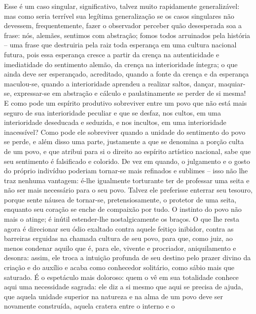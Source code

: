     Esse é um caso singular, significativo, talvez muito rapidamente
    generalizável: mas como seria terrível sua legítima generalização
    se os casos singulares não devessem, frequentemente, fazer o
    observador perceber quão desesperada soa a frase: nós, alemães,
    sentimos com abstração; fomos todos arruinados pela história -- uma
    frase que destruiria pela raiz toda esperança em uma cultura
    nacional futura, pois essa esperança cresce a partir da crença na
    autenticidade e imediatidade do sentimento alemão, da crença na
    interioridade íntegra; o que ainda deve ser esperançado, acreditado,
    quando a fonte da crença e da esperança maculou-se, quando a
    interioridade aprendeu a realizar saltos, dançar, maquiar-se,
    expressar-se em abstração e cálculo e paulatinamente se perder de si
    mesma! E como pode um espírito produtivo sobreviver entre um povo
    que não está mais seguro de sua interioridade peculiar e que se
    desfaz, nos cultos, em uma interioridade deseducada e seduzida, e
    nos incultos, em uma interioridade inacessível? Como pode ele
    sobreviver quando a unidade do sentimento do povo se perde, e além
    disso uma parte, justamente a que se denomina a porção culta de um
    povo, e que atribui para si o direito ao espírito artístico
    nacional, sabe que seu sentimento é falsificado e colorido. De vez
    em quando, o julgamento e o gosto do próprio indivíduo poderiam
    tornar-se mais refinados e sublimes -- isso não lhe traz nenhuma
    vantagem: é-lhe igualmente torturante ter de professar uma seita e
    não ser mais necessário para o seu povo. Talvez ele preferisse
    enterrar seu tesouro, porque sente náusea de tornar-se,
    pretensiosamente, o protetor de uma seita, enquanto seu coração se
    enche de compaixão por tudo. O instinto do povo não mais o atinge; é
    inútil estender-lhe nostalgicamente os braços. O que lhe resta agora
    é direcionar seu ódio exaltado contra aquele feitiço inibidor,
    contra as barreiras erguidas na chamada cultura de seu povo, para
    que, como juiz, ao menos condenar aquilo que é, para ele, vivente e
    procriador, aniquilamento e desonra: assim, ele troca a intuição
    profunda de seu destino pelo prazer divino da criação e do auxílio e
    acaba como conhecedor solitário, como sábio mais que saturado. É o
    espetáculo mais doloroso: quem o vê em sua totalidade conhece aqui
    uma necessidade sagrada: ele diz a si mesmo que aqui se precisa de
    ajuda, que aquela unidade superior na natureza e na alma de um povo
    deve ser novamente construída, aquela cratera entre o interno e o
